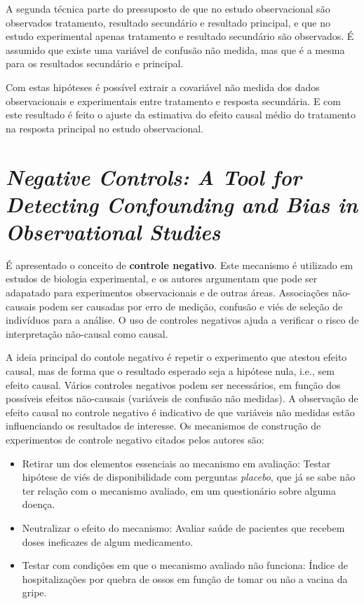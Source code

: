 \documentclass[final,5p]{elsarticle}
\numberwithin{equation}{section}
\begin{document}
    A segunda técnica parte do pressuposto de que no estudo observacional são observados tratamento, resultado secundário e resultado principal, e que no estudo experimental apenas tratamento e resultado secundário são observados. É assumido que existe uma variável de confusão não medida, mas que é a mesma para os resultados secundário e principal.

    Com estas hipóteses é possível extrair a covariável não medida dos dados observacionais e experimentais entre tratamento e resposta secundária. E com este resultado é feito o ajuste da estimativa do efeito causal médio do tratamento na resposta principal no estudo observacional.

\section{\textit{Negative Controls: A Tool for Detecting Confounding and Bias in Observational Studies}}

    É apresentado o conceito de \textbf{controle negativo}. Este mecanismo é utilizado em estudos de biologia experimental, e os autores argumentam que pode ser adapatado para experimentos observacionais e de outras áreas. Associações não-causais podem ser causadas por erro de medição, confusão e viés de seleção de indivíduos para a análise. O uso de controles negativos ajuda a verificar o risco de interpretação não-causal como causal.

    A ideia principal do contole negativo é repetir o experimento que atestou efeito causal, mas de forma que o resultado esperado seja a hipótese nula, i.e., sem efeito causal. Vários controles negativos podem ser necessários, em função dos possíveis efeitos não-causais (variáveis de confusão não medidas). A observação de efeito causal no controle negativo é indicativo de que variáveis não medidas estão influenciando os resultados de interesse. Os mecanismos de construção de experimentos de controle negativo citados pelos autores são:

    \begin{itemize}
        \item Retirar um dos elementos essenciais ao mecanismo em avaliação: Testar hipótese de viés de disponibilidade com perguntas \emph{placebo}, que já se sabe não ter relação com o mecanismo avaliado, em um questionário sobre alguma doença.
        \item Neutralizar o efeito do mecanismo: Avaliar saúde de pacientes que recebem doses ineficazes de algum medicamento.
        \item Testar com condições em que o mecanismo avaliado não funciona: Índice de hospitalizações por quebra de ossos em função de tomar ou não a vacina da gripe.
    \end{itemize}
\end{document}
